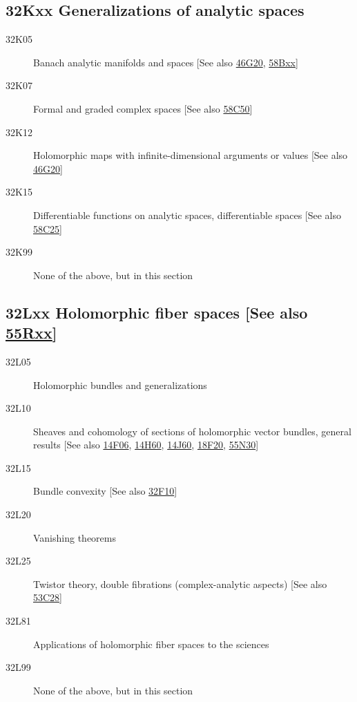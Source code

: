 \subsection*{32Kxx  Generalizations of analytic spaces }\label{32Kxx}
\begin{description}  
\item [32K05]\label{32K05} Banach analytic manifolds and spaces [See also \hyperref[46G20]{46G20}, \hyperref[58Bxx]{58Bxx}]
\item [32K07]\label{32K07} Formal and graded complex spaces [See also \hyperref[58C50]{58C50}]
\item [32K12]\label{32K12} Holomorphic maps with infinite-dimensional arguments or values [See also \hyperref[46G20]{46G20}]
\item [32K15]\label{32K15} Differentiable functions on analytic spaces, differentiable spaces [See also \hyperref[58C25]{58C25}]
\item [32K99]\label{32K99} None of the above, but in this section
\end{description}
\subsection*{32Lxx  Holomorphic fiber spaces [See also \hyperref[55Rxx]{55Rxx}] }\label{32Lxx}
\begin{description}  
\item [32L05]\label{32L05} Holomorphic bundles and generalizations
\item [32L10]\label{32L10} Sheaves and cohomology of sections of holomorphic vector bundles, general results [See also \hyperref[14F06]{14F06}, \hyperref[14H60]{14H60}, \hyperref[14J60]{14J60}, \hyperref[18F20]{18F20}, \hyperref[55N30]{55N30}]
\item [32L15]\label{32L15} Bundle convexity [See also \hyperref[32F10]{32F10}]
\item [32L20]\label{32L20} Vanishing theorems
\item [32L25]\label{32L25} Twistor theory, double fibrations (complex-analytic aspects) [See also \hyperref[53C28]{53C28}]
\item [32L81]\label{32L81} Applications of holomorphic fiber spaces to the sciences
\item [32L99]\label{32L99} None of the above, but in this section
\end{description}

